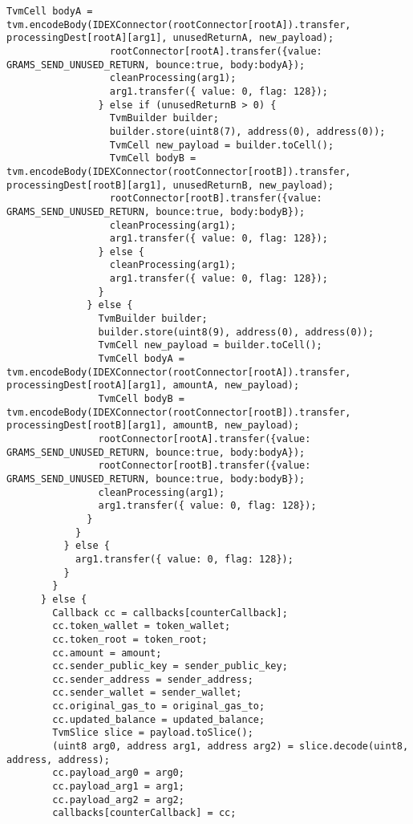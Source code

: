\begin{lstlisting}[firstnumber=248]
                  TvmCell bodyA = tvm.encodeBody(IDEXConnector(rootConnector[rootA]).transfer, processingDest[rootA][arg1], unusedReturnA, new_payload);
                  rootConnector[rootA].transfer({value: GRAMS_SEND_UNUSED_RETURN, bounce:true, body:bodyA});
                  cleanProcessing(arg1);
                  arg1.transfer({ value: 0, flag: 128});
                } else if (unusedReturnB > 0) {
                  TvmBuilder builder;
                  builder.store(uint8(7), address(0), address(0));
                  TvmCell new_payload = builder.toCell();
                  TvmCell bodyB = tvm.encodeBody(IDEXConnector(rootConnector[rootB]).transfer, processingDest[rootB][arg1], unusedReturnB, new_payload);
                  rootConnector[rootB].transfer({value: GRAMS_SEND_UNUSED_RETURN, bounce:true, body:bodyB});
                  cleanProcessing(arg1);
                  arg1.transfer({ value: 0, flag: 128});
                } else {
                  cleanProcessing(arg1);
                  arg1.transfer({ value: 0, flag: 128});
                }
              } else {
                TvmBuilder builder;
                builder.store(uint8(9), address(0), address(0));
                TvmCell new_payload = builder.toCell();
                TvmCell bodyA = tvm.encodeBody(IDEXConnector(rootConnector[rootA]).transfer, processingDest[rootA][arg1], amountA, new_payload);
                TvmCell bodyB = tvm.encodeBody(IDEXConnector(rootConnector[rootB]).transfer, processingDest[rootB][arg1], amountB, new_payload);
                rootConnector[rootA].transfer({value: GRAMS_SEND_UNUSED_RETURN, bounce:true, body:bodyA});
                rootConnector[rootB].transfer({value: GRAMS_SEND_UNUSED_RETURN, bounce:true, body:bodyB});
                cleanProcessing(arg1);
                arg1.transfer({ value: 0, flag: 128});
              }
            }
          } else {
            arg1.transfer({ value: 0, flag: 128});
          }
        }
      } else {
        Callback cc = callbacks[counterCallback];
        cc.token_wallet = token_wallet;
        cc.token_root = token_root;
        cc.amount = amount;
        cc.sender_public_key = sender_public_key;
        cc.sender_address = sender_address;
        cc.sender_wallet = sender_wallet;
        cc.original_gas_to = original_gas_to;
        cc.updated_balance = updated_balance;
        TvmSlice slice = payload.toSlice();
        (uint8 arg0, address arg1, address arg2) = slice.decode(uint8, address, address);
        cc.payload_arg0 = arg0;
        cc.payload_arg1 = arg1;
        cc.payload_arg2 = arg2;
        callbacks[counterCallback] = cc;

\end{lstlisting}
